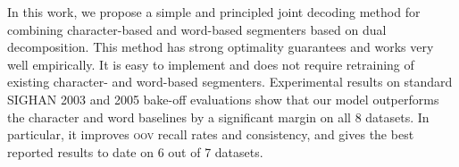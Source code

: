 In this work, we propose a simple and principled joint decoding method for combining character-based and word-based segmenters based on dual decomposition. This method has strong optimality guarantees and works very well empirically. It is easy to implement and does not require retraining of existing character- and word-based segmenters.
Experimental results on standard SIGHAN 2003 and 2005 bake-off evaluations show that our model outperforms the character and word baselines by a significant margin on all 8 datasets. %
In particular, it improves \textsc{oov} recall rates and consistency, %
and gives the best reported results to date on 6 out of 7 datasets. 